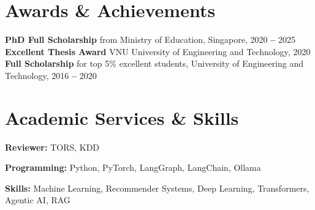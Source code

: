 \documentclass[letterpaper,11pt]{article}
\newcommand{\resumeSubHeadingListStart}{\begin{itemize}[leftmargin=0.15in, label={}]}
\newcommand{\resumeSubHeadingListEnd}{\end{itemize}}
\begin{document}
\section{Awards \& Achievements}
\vspace{2pt}
\resumeSubHeadingListStart
\small{\item{
              \textbf{PhD Full Scholarship} from Ministry of Education, Singapore, 2020 \textbf{--} 2025 \\ \vspace{3pt}
              \textbf{Excellent Thesis Award} VNU University of Engineering and Technology, 2020 \\ \vspace{3pt}
              \textbf{Full Scholarship} for top 5\% excellent students, University of Engineering and Technology, 2016 \textbf{--} 2020
        }}
\resumeSubHeadingListEnd




\section{Academic Services \& Skills}
\vspace{2pt}
\resumeSubHeadingListStart
\small{\item{

              \textbf{Reviewer:}{ TORS, KDD } \\ \vspace{3pt}

              \textbf{Programming:}{ Python, PyTorch, LangGraph, LangChain, Ollama} \\ \vspace{3pt}

              \textbf{Skills:}{ Machine Learning, Recommender Systems, Deep Learning, Transformers, Agentic AI, RAG} \\ \vspace{3pt}

        }}
\resumeSubHeadingListEnd



\end{document}
